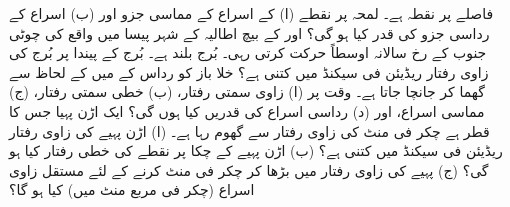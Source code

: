   فاصلے پر  نقطہ ہے۔ لمحہ  پر  نقطے  (ا) کے اسراع کے مماسی جزو  اور (ب) اسراع کے رداسی جزو کی قدر کیا ہو گی؟
 اور  کے بیچ  اطالیہ   کے شہر  پیسا  میں واقع   کی چوٹی    جنوب کے رخ سالانہ  اوسطاً    حرکت کرتی رہی۔ بُرج  بلند ہے۔ بُرج کے پیندا پر  بُرج کی زاوی رفتار ریڈیئن فی سیکنڈ میں  کتنی  ہے؟ 
خلا باز  کو   رداس کے   میں  کے لحاظ سے گھما کر  جانچا جاتا ہے۔ وقت  پر (ا) زاوی سمتی رفتار، (ب) خطی سمتی رفتار، (ج) مماسی اسراع، اور (د) رداسی اسراع کی قدریں کیا ہوں گی؟
ایک اڑن پہیا جس کا قطر  ہے  چکر فی منٹ کی زاوی رفتار سے گھوم رہا ہے۔ (ا)  اڑن پہیے کی زاوی رفتار ریڈیئن فی سیکنڈ میں کتنی ہے؟ (ب) اڑن پہیے کے چکا پر نقطے کی خطی رفتار کیا ہو گی؟ (ج)  پہیے کی زاوی رفتار  میں بڑھا کر    چکر فی منٹ   کرنے کے لئے مستقل زاوی اسراع (چکر فی مربع  منٹ میں) کیا ہو گا؟

